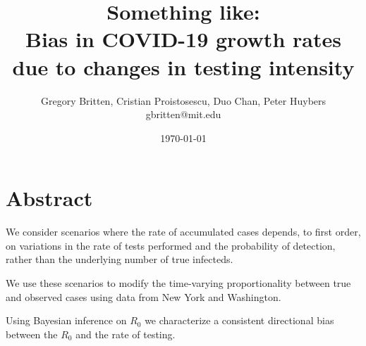 \documentclass[11pt]{article}
\title{Something like: \\ Bias in COVID-19 growth rates due to changes in testing intensity}
\author{Gregory Britten, Cristian Proistosescu, Duo Chan, Peter Huybers\\gbritten@mit.edu}
\date{\small{\printdayoff\today}}
\begin{document}
\maketitle 
\vspace{-0.5cm}
\linenumbers
\section*{Abstract}
We consider scenarios where the rate of accumulated cases depends, to first order, on variations in the rate of tests performed and the probability of detection, rather than the underlying number of true infecteds.

We use these scenarios to modify the time-varying proportionality between true and observed cases using data from New York and Washington.

Using Bayesian inference on $R_0$ we characterize a consistent directional bias between the $R_0$ and the rate of testing.
\end{document}
